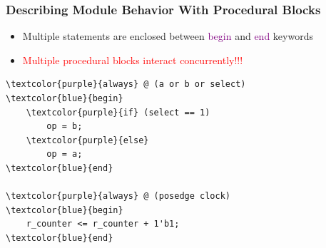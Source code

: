 \documentclass[t]{beamer}
\begin{document}
\begin{frame}[fragile]
\frametitle{Describing Module Behavior With Procedural Blocks}


\begin{itemize}
\item Multiple statements are enclosed between \textcolor{purple}{begin} and \textcolor{purple}{end} keywords
\item \textcolor{red}{Multiple procedural blocks interact concurrently!!!}
\end{itemize}
\vspace{3pt}
{\scriptsize%
\begin{Verbatim}[commandchars=\\\{\}, tabsize=2]
\textcolor{purple}{always} @ (a or b or select)
\textcolor{blue}{begin}
	\textcolor{purple}{if} (select == 1)
		op = b;
	\textcolor{purple}{else}
		op = a;
\textcolor{blue}{end}

\textcolor{purple}{always} @ (posedge clock)
\textcolor{blue}{begin}
	r_counter <= r_counter + 1'b1;
\textcolor{blue}{end}
\end{Verbatim}
}

\end{frame}
\end{document}
